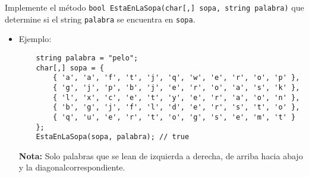 Implemente el método \texttt{bool EstaEnLaSopa(char[,] sopa, string palabra)} que determine si el string \texttt{palabra} se encuentra en \texttt{sopa}. 
\begin{itemize}
    \item Ejemplo: 
    \begin{lstlisting}
    string palabra = "pelo"; 
    char[,] sopa = { 
        { 'a', 'a', 'f', 't', 'j', 'q', 'w', 'e', 'r', 'o', 'p' }, 
        { 'g', 'j', 'p', 'b', 'j', 'e', 'r', 'o', 'a', 's', 'k' }, 
        { 'l', 'x', 'c', 'e', 't', 'y', 'e', 'r', 'a', 'o', 'n' }, 
        { 'b', 'g', 'j', 'f', 'l', 'd', 'e', 'r', 's', 't', 'o' }, 
        { 'q', 'u', 'e', 'r', 't', 'o', 'g', 's', 'e', 'm', 't' } 
    }; 
    EstaEnLaSopa(sopa, palabra); // true
    \end{lstlisting}
    \textbf{Nota:} Solo palabras que se lean de izquierda a derecha, de arriba hacia abajo y la diagonalcorrespondiente.
\end{itemize}
